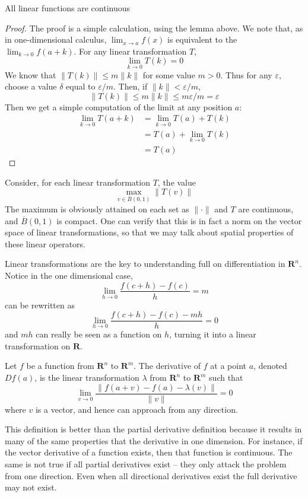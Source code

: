 \begin{corollary}
  All linear functions are continuous
\end{corollary}
\begin{proof}
  The proof is a simple calculation, using the lemma above. We note that, as in one-dimensional calculus, $\lim_{x \to a} f(x)$ is equivalent to the $\lim_{k \to 0} f(a + k)$. For any linear transformation $T$,
  \[ \lim_{k \to 0} T(k) = 0 \]
  We know that $\| T(k) \| \leq m \| k \|$ for some value $m > 0$. Thus for any $\varepsilon$, choose a value $\delta$ equal to $\varepsilon/m$. Then, if $\| k \| < \varepsilon/m$,
  \[ \| T(k) \| \leq m \| k \| \leq m \varepsilon/m = \varepsilon \]
  Then we get a simple computation of the limit at any position $a$:
  \begin{align*}
    \lim_{k \to 0} T(a + k) &= \lim_{k \to 0} T(a) + T(k)\\
                            &= T(a) + \lim_{k \to 0} T(k)\\
                            &= T(a)
  \end{align*}
\end{proof}

Consider, for each linear transformation $T$, the value
%
\[ \max_{v \in \overline{B}(0,1)} \|T(v)\| \]
%
The maximum is obviously attained on each set as $\|\cdot\|$ and $T$ are continuous, and $\overline{B}(0,1)$ is compact. One can verify that this is in fact a norm on the vector space of linear transformations, so that we may talk about spatial properties of these linear operators.

Linear transformations are the key to understanding full on differentiation in $\mathbf{R}^n$. Notice in the one dimensional case,
%
\[ \lim_{h \to 0} \frac{f(c + h) - f(c)}{h} = m \]
%
can be rewritten as
%
\[ \lim_{h \to 0} \frac{f(c + h) - f(c) - mh}{h} = 0 \]
%
and $mh$ can really be seen as a function on $h$, turning it into a linear transformation on $\mathbf{R}$.

\begin{definition}
  Let $f$ be a function from $\mathbf{R}^n$ to $\mathbf{R}^m$. The derivative of $f$ at a point $a$, denoted $Df(a)$, is the linear transformation $\lambda$ from $\mathbf{R}^n$ to $\mathbf{R}^m$ such that
  \[ \lim_{v \to 0} \frac{\|f(a + v) - f(a) - \lambda(v)\|}{\|v\|} = 0 \]
  where $v$ is a vector, and hence can approach from any direction.
\end{definition}

This definition is better than the partial derivative definition because it results in many of the same properties that the derivative in one dimension. For instance, if the vector derivative of a function exists, then that function is continuous. The same is not true if all partial derivatives exist -- they only attack the problem from one direction. Even when all directional derivatives exist the full derivative may not exist.

